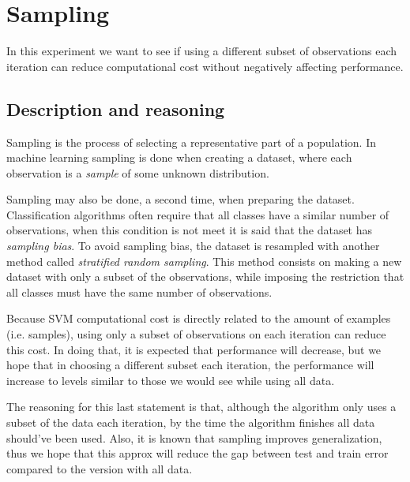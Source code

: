 \newcommand{\VS}{\vspace{6pt}}
\newcommand{\vt}[1]{\vec{#1}}

\chapter{Sampling} %

In this experiment we want to see if using a different subset of observations each iteration can reduce computational cost without negatively affecting performance.

\label{Chapter1} %



\section{Description and reasoning}
\label{sec:ch5.sampling.desc}

Sampling is the process of selecting a representative part of a population. In machine learning sampling is done when creating a dataset, where each observation is a \emph{sample} of some unknown distribution. 

Sampling may also be done, a second time, when preparing the dataset. Clas\-si\-fi\-cation algorithms often require that all classes have a similar number of ob\-ser\-va\-tions, when this condition is not meet it is said that the dataset has \emph{sampling bias}. To avoid sampling bias, the dataset is resampled with another method called \emph{stratified random sampling}. This method consists on making a new dataset with only a subset of the observations, while imposing the restriction that all classes must have the same number of observations.

Because SVM computational cost is directly related to the amount of examples (i.e. samples), using only a subset of observations on each iteration can reduce this cost. In doing that, it is expected that performance will decrease, but we hope that in choosing a different subset each iteration, the performance will increase to levels similar to those we would see while using all data.

The reasoning for this last statement is that, although the algorithm only uses a subset of the data each iteration, by the time the algorithm finishes all data should've been used. Also, it is known that sampling improves generalization, thus we hope that this approx will reduce the gap between test and train error compared to the version with all data.

